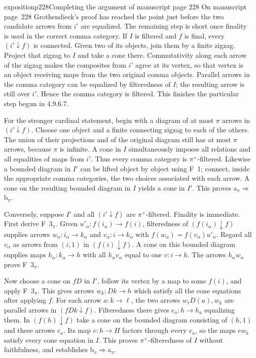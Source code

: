 \begin{dcomment}{exposition}{p228}{Completing the argument of manuscript page 228}
On manuscript page~228 Grothendieck's proof has reached the point just before the two candidate arrows from $i'$ are equalized. The remaining step is short once finality is used in the correct comma category. If $I$ is filtered and $f$ is final, every $(i'\downarrow f)$ is connected. Given two of its objects, join them by a finite zigzag. Project that zigzag to $I$ and take a cone there. Commutativity along each arrow of the zigzag makes the composites from $i'$ agree at its vertex, so that vertex is an object receiving maps from the two original comma objects. Parallel arrows in the comma category can be equalized by filteredness of $I$; the resulting arrow is still over $i'$. Hence the comma category is filtered. This finishes the particular step begun in 4.9.6.7.

For the stronger cardinal statement, begin with a diagram of at most $\pi$ arrows in $(i'\downarrow f)$. Choose one object and a finite connecting zigzag to each of the others. The union of their projections and of the original diagram still has at most $\pi$ arrows, because $\pi$ is infinite. A cone in $I$ simultaneously imposes all relations and all equalities of maps from $i'$. Thus every comma category is $\pi^+$-filtered. Likewise a bounded diagram in $I'$ can be lifted object by object using F~1; connect, inside the appropriate comma categories, the two choices associated with each arrow. A cone on the resulting bounded diagram in $I$ yields a cone in $I'$. This proves a$_\pi\Rightarrow$b$_\pi$.

Conversely, suppose $I'$ and all $(i'\downarrow f)$ are $\pi^+$-filtered. Finality is immediate. First derive F~$3_\pi$. Given $u'_\alpha:f(i_\alpha)\to f(i)$, filteredness of $(f(i_\alpha)\downarrow f)$ supplies arrows $w_\alpha:i_\alpha\to k_\alpha$ and $v_\alpha:i\to k_\alpha$ with $f(w_\alpha)=f(v_\alpha)u'_\alpha$. Regard all $v_\alpha$ as arrows from $(i,1)$ in $(f(i)\downarrow f)$. A cone on this bounded diagram supplies maps $h_\alpha:k_\alpha\to h$ with all $h_\alpha v_\alpha$ equal to one $v:i\to h$. The arrows $h_\alpha w_\alpha$ prove F~$3_\pi$.

Now choose a cone on $fD$ in $I'$, follow its vertex by a map to some $f(i)$, and apply F~$3_\pi$. This gives arrows $w_k:Dk\to h$ which satisfy all the cone equations after applying $f$. For each arrow $a:k\to\ell$, the two arrows $w_\ell D(a),w_k$ are parallel arrows in $(fDk\downarrow f)$. Filteredness there gives $e_a:h\to h_a$ equalizing them. In $(f(h)\downarrow f)$ take a cone on the bounded diagram consisting of $(h,1)$ and these arrows $e_a$. Its map $e:h\to H$ factors through every $e_a$, so the maps $ew_k$ satisfy every cone equation in $I$. This proves $\pi^+$-filteredness of $I$ without faithfulness, and establishes b$_\pi\Rightarrow$a$_\pi$.


\end{dcomment}
